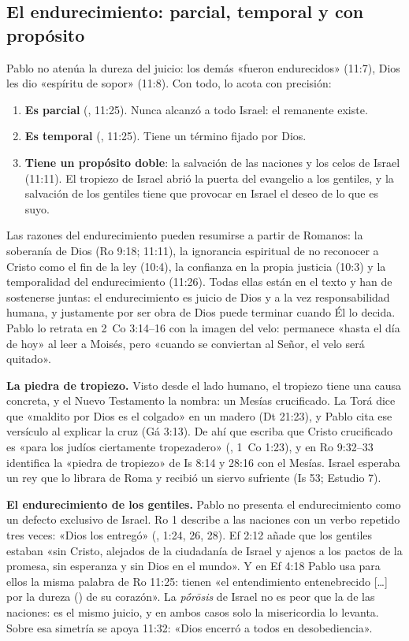 \subsection{El endurecimiento: parcial, temporal y con propósito}
Pablo no atenúa la dureza del juicio: los demás «fueron endurecidos» (11:7), Dios les dio «espíritu de sopor» (11:8). Con todo, lo acota con precisión:
\begin{enumerate}
\item \textbf{Es parcial} (, 11:25). Nunca alcanzó a todo Israel: el remanente existe.
\item \textbf{Es temporal} (, 11:25). Tiene un término fijado por Dios.
\item \textbf{Tiene un propósito doble}: la salvación de las naciones y los celos de Israel (11:11). El tropiezo de Israel abrió la puerta del evangelio a los gentiles, y la salvación de los gentiles tiene que provocar en Israel el deseo de lo que es suyo.
\end{enumerate}
Las razones del endurecimiento pueden resumirse a partir de Romanos: la soberanía de Dios (Ro 9:18; 11:11), la ignorancia espiritual de no reconocer a Cristo como el fin de la ley (10:4), la confianza en la propia justicia (10:3) y la temporalidad del endurecimiento (11:26). Todas ellas están en el texto y han de sostenerse juntas: el endurecimiento es juicio de Dios y a la vez responsabilidad humana, y justamente por ser obra de Dios puede terminar cuando Él lo decida. Pablo lo retrata en 2~Co 3:14--16 con la imagen del velo: permanece «hasta el día de hoy» al leer a Moisés, pero «cuando se conviertan al Señor, el velo será quitado».

\textbf{La piedra de tropiezo.} Visto desde el lado humano, el tropiezo tiene una causa concreta, y el Nuevo Testamento la nombra: un Mesías crucificado. La Torá dice que «maldito por Dios es el colgado» en un madero (Dt 21:23), y Pablo cita ese versículo al explicar la cruz (Gá 3:13). De ahí que escriba que Cristo crucificado es «para los judíos ciertamente tropezadero» (, 1~Co 1:23), y en Ro 9:32--33 identifica la «piedra de tropiezo» de Is 8:14 y 28:16 con el Mesías. Israel esperaba un rey que lo librara de Roma y recibió un siervo sufriente (Is 53; Estudio 7).

\textbf{El endurecimiento de los gentiles.} Pablo no presenta el endurecimiento como un defecto exclusivo de Israel. Ro 1 describe a las naciones con un verbo repetido tres veces: «Dios los entregó» (, 1:24, 26, 28). Ef 2:12 añade que los gentiles estaban «sin Cristo, alejados de la ciudadanía de Israel y ajenos a los pactos de la promesa, sin esperanza y sin Dios en el mundo». Y en Ef 4:18 Pablo usa para ellos la misma palabra de Ro 11:25: tienen «el entendimiento entenebrecido [\ldots] por la dureza () de su corazón». La \emph{pṓrōsis} de Israel no es peor que la de las naciones: es el mismo juicio, y en ambos casos solo la misericordia lo levanta. Sobre esa simetría se apoya 11:32: «Dios encerró a todos en desobediencia».

